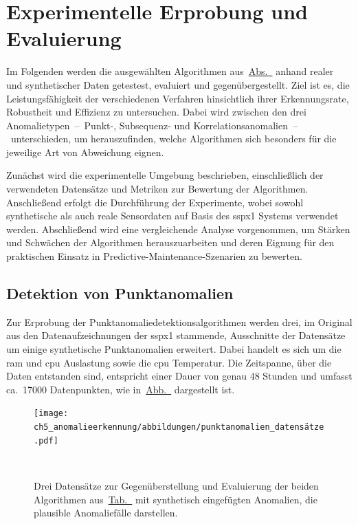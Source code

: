  \chapter{Experimentelle Erprobung und Evaluierung}\label{ch:anomaliedetektion_test}
Im Folgenden werden die ausgewählten Algorithmen aus~\hyperref[sec:algorithmen]{Abs.~} anhand realer und synthetischer
Daten getestest, evaluiert und gegenübergestellt. Ziel ist es, die Leistungsfähigkeit der verschiedenen Verfahren hinsichtlich ihrer
Erkennungsrate, Robustheit und Effizienz zu untersuchen. Dabei wird zwischen den drei Anomalietypen~–~Punkt-, Subsequenz- und
Korrelationsanomalien~–~unterschieden, um herauszufinden, welche Algorithmen sich besonders für die jeweilige Art von Abweichung eignen.

Zunächst wird die experimentelle Umgebung beschrieben, einschließlich der verwendeten Datensätze und Metriken zur Bewertung der Algorithmen.
Anschließend erfolgt die Durchführung der Experimente, wobei sowohl synthetische als auch reale Sensordaten auf Basis des \ac{sspx1} Systems
verwendet werden. Abschließend wird eine vergleichende Analyse vorgenommen, um Stärken und Schwächen der Algorithmen herauszuarbeiten und
deren Eignung für den praktischen Einsatz in Predictive-Maintenance-Szenarien zu bewerten.

\section{Detektion von Punktanomalien}\label{sec:punktanomaliedetektion}
Zur Erprobung der Punktanomaliedetektionsalgorithmen werden drei, im Original aus den Datenaufzeichnungen der \ac{sspx1} stammende, Ausschnitte 
der Datensätze um einige synthetische Punktanomalien erweitert. Dabei handelt es sich um die \ac{ram} und \ac{cpu} Auslastung sowie die \ac{cpu} Temperatur.
Die Zeitspanne, über die Daten entstanden sind, entspricht einer Dauer von genau 48 Stunden und umfasst ca.~17000 Datenpunkten, wie
in~\hyperref[fig:punktanomalien_testdata]{Abb.~} dargestellt ist.

\begin{figure}[t!]
    \centering
        \texttt{[image: ch5\_anomalieerkennung/abbildungen/punktanomalien\_datensätze.pdf]}
    \caption{\centering Drei Datensätze zur Gegenüberstellung und Evaluierung der beiden Algorithmen
    aus~\hyperref[tab:algorithmen]{Tab.~} mit synthetisch eingefügten Anomalien, die plausible Anomaliefälle darstellen.}
~\label{fig:punktanomalien_testdata}
\end{figure}

